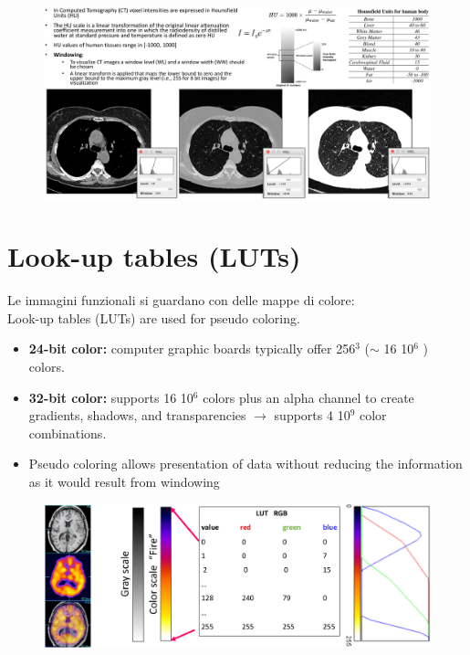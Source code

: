 \begin{figure}[ht]
	\centering
	\includegraphics[width=1\linewidth]{figure_med/img_windowing}
\end{figure}
\FloatBarrier

\section{Look-up tables (LUTs)}
Le immagini funzionali si guardano con delle mappe di colore:\\
Look-up tables (LUTs) are used for pseudo coloring.
\begin{itemize}
	\item \textbf{24-bit color:} computer graphic boards typically offer 256$^3$ ($\sim$ 16 10$^6$ ) colors.
	\item \textbf{32-bit color:} supports 16 10$^6$ colors plus an alpha channel to create gradients,
	shadows, and transparencies $\rightarrow$ supports 4 10$^9$ color combinations.
	\item Pseudo coloring allows presentation of data without reducing the information as it
	would result from windowing
\end{itemize}

\begin{figure}[ht]
	\centering
	\includegraphics[width=0.9\linewidth]{figure_med/luts}
\end{figure}
 \FloatBarrier

